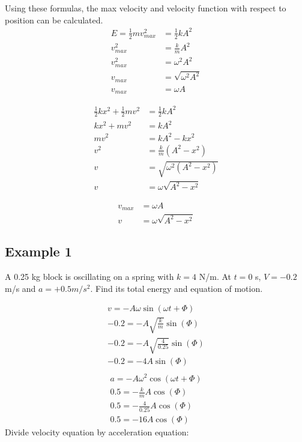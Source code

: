 \documentclass{article}
\theoremstyle{mytheoremstyle}
\theoremstyle{mytheoremstyle}
\theoremstyle{myproblemstyle}
\begin{document}
    Using these formulas, the max velocity and velocity function with respect to
    position can be calculated.
    \begin{align*}
        E = \frac{1}{2} mv_{max}^2 &= \frac{1}{2} kA^2 \\
        v_{max}^2 &= \frac{k}{m} A^2 \\
        v_{max}^2 &= \omega^2 A^2 \\
        v_{max} &= \sqrt{\omega^2 A^2} \\
        v_{max} &= \omega A
    \end{align*}

    \begin{align*}
        \frac{1}{2} kx^2 + \frac{1}{2} mv^2 &= \frac{1}{2} kA^2 \\
        kx^2 + mv^2 &= kA^2 \\
        mv^2 &= kA^2 - kx^2 \\
        v^2 &= \frac{k}{m} (A^2 - x^2) \\
        v &= \sqrt{\omega^2 (A^2 - x^2)} \\
        v &= \omega\sqrt{A^2 - x^2}
    \end{align*}

    \begin{align*}
        v_{max} &= \omega A \\
        v &= \omega \sqrt{A^2-x^2}
    \end{align*}

    \subsection*{Example 1}
    A 0.25 kg block is oscillating on a spring with $k=4$ N/m. At $t=0$ s,
    $V=-0.2$ m/s and $a=+0.5 m/s^2$. Find its total energy and equation of
    motion.

    \begin{align*}
        v = -A\omega\sin(\omega t + \Phi) \\
        -0.2 = -A\sqrt{\frac{k}{m}}\sin(\Phi) \\
        -0.2 = -A\sqrt{\frac{4}{0.25}}\sin(\Phi) \\
        -0.2 = -4A\sin(\Phi) \\
    \end{align*}
    \begin{align*}
        a = -A\omega^2\cos(\omega t + \Phi) \\
        0.5 = -\frac{k}{m} A\cos(\Phi) \\
        0.5 = -\frac{4}{0.25} A\cos(\Phi) \\
        0.5 = -16 A\cos(\Phi)
    \end{align*}
    Divide velocity equation by acceleration equation:
\end{document}
